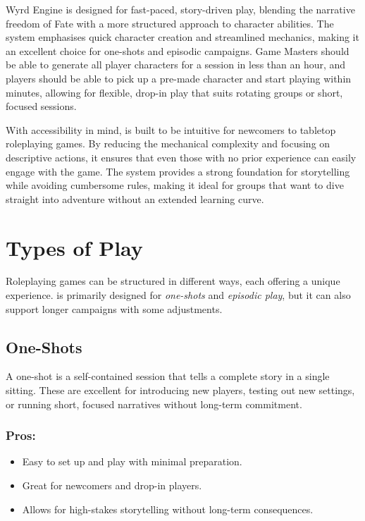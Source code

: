 

 Wyrd Engine is designed for fast-paced, story-driven play, blending the narrative freedom of Fate with a more structured approach to character abilities. The system emphasises quick character creation and streamlined mechanics, making it an excellent choice for one-shots and episodic campaigns. Game Masters should be able to generate all player characters for a session in less than an hour, and players should be able to pick up a pre-made character and start playing within minutes, allowing for flexible, drop-in play that suits rotating groups or short, focused sessions.

With accessibility in mind, \wyrd is built to be intuitive for newcomers to tabletop roleplaying games. By reducing the mechanical complexity and focusing on descriptive actions, it ensures that even those with no prior experience can easily engage with the game. The system provides a strong foundation for storytelling while avoiding cumbersome rules, making it ideal for groups that want to dive straight into adventure without an extended learning curve.


\section{Types of Play}

Roleplaying games can be structured in different ways, each offering a unique experience. \wyrd is primarily designed for \emph{one-shots} and \emph{episodic play}, but it can also support longer campaigns with some adjustments.

\subsection{One-Shots}
A one-shot is a self-contained session that tells a complete story in a single sitting. These are excellent for introducing new players, testing out new settings, or running short, focused narratives without long-term commitment.

\subsubsection{Pros:}
\begin{itemize}
    \item Easy to set up and play with minimal preparation.
    \item Great for newcomers and drop-in players.
    \item Allows for high-stakes storytelling without long-term consequences.
\end{itemize}

